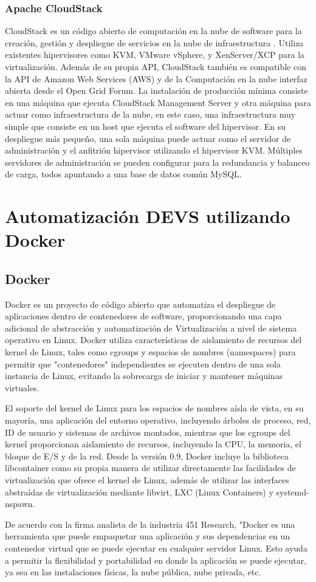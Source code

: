 \subsection{Apache CloudStack}
CloudStack es un código abierto de computación en la nube de software para la creación, gestión y despliegue de servicios en la nube de infraestructura . Utiliza existentes hipervisores como KVM, VMware vSphere, y XenServer/XCP para la virtualización. Además de su propia API, CloudStack también es compatible con la API de Amazon Web Services (AWS) y de la Computación en la nube interfaz abierta desde el Open Grid Forum.
La instalación de producción mínima consiste en una máquina que ejecuta CloudStack Management Server y otra máquina para actuar como infraestructura de la nube, en este caso, una infraestructura muy simple que consiste en un host que ejecuta el software del hipervisor. En su despliegue más pequeño, una sola máquina puede actuar como el servidor de administración y el anfitrión hipervisor utilizando el hipervisor KVM. Múltiples servidores de administración se pueden configurar para la redundancia y balanceo de carga, todos apuntando a una base de datos común MySQL.

\chapter{Automatización DEVS utilizando Docker}

\section{Docker}

Docker es un proyecto de código abierto que automatiza el despliegue de aplicaciones dentro de contenedores de software, proporcionando una capa adicional de abstracción y automatización de Virtualización a nivel de sistema operativo en Linux. Docker utiliza características de aislamiento de recursos del kernel de Linux, tales como cgroups y espacios de nombres (namespaces) para permitir que "contenedores" independientes se ejecuten dentro de una sola instancia de Linux, evitando la sobrecarga de iniciar y mantener máquinas virtuales.

El soporte del kernel de Linux para los espacios de nombres aísla de vista, en su mayoría, una aplicación del entorno operativo, incluyendo árboles de proceso, red, ID de usuario y sistemas de archivos montados, mientras que los cgroups del kernel proporcionan aislamiento de recursos, incluyendo la CPU, la memoria, el bloque de E/S y de la red. Desde la versión 0.9, Docker incluye la biblioteca libcontainer como su propia manera de utilizar directamente las facilidades de virtualización que ofrece el kernel de Linux, además de utilizar las interfaces abstraídas de virtualización mediante libvirt, LXC (Linux Containers) y systemd-nspawn.

De acuerdo con la firma analista de la industria 451 Research, "Docker es una herramienta que puede empaquetar una aplicación y sus dependencias en un contenedor virtual que se puede ejecutar en cualquier servidor Linux. Esto ayuda a permitir la flexibilidad y portabilidad en donde la aplicación se puede ejecutar, ya sea en las instalaciones físicas, la nube pública, nube privada, etc.